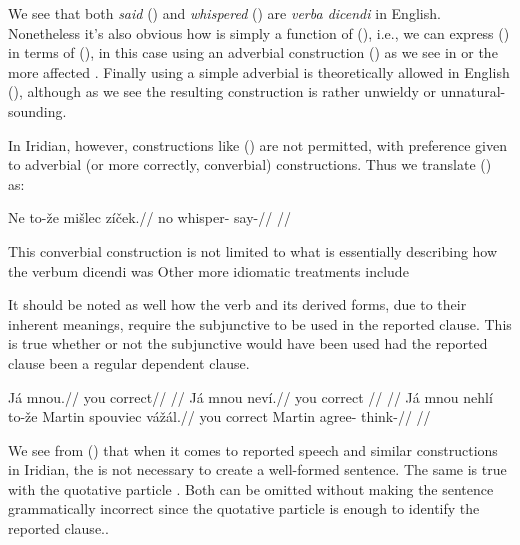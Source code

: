 \smallskip

We see that both \emph{said} () and \emph{whispered} () are \emph{verba dicendi} in English. Nonetheless it's also obvious how  is simply a function of (), i.e., we can express () in terms of (), in this case using an adverbial construction () as we see in  or the more affected . Finally using a simple adverbial is theoretically allowed in English (), although as we see the resulting construction is rather unwieldy or unnatural-sounding.

In Iridian, however, constructions like () are not permitted, with preference given to adverbial (or more correctly, converbial) constructions. Thus we translate () as:

\pex
\begingl
\gla Ne to-\v{z}e mi\v{s}lec z\'i\v{c}ek.//
\glb no  whisper- say-//
\glft {}//
\endgl
\xe


This converbial construction is not limited to what is essentially describing how the verbum dicendi was  Other more idiomatic treatments include


It should be noted as well how the verb  and its derived forms, due to their inherent meanings, require the subjunctive to be used in the reported clause. This is true whether or not the subjunctive would have been used had the reported clause been a regular dependent clause.


\pex
\a
\begingl
  \gla Já mnou.//
  \glb you correct//
  \glft {}//
\endgl
\a
\begingl
  \gla Já mnou nev\'i.//
  \glb you correct //
  \glft {}//
\endgl
\a
\begingl
  \gla Já mnou nehl\'i to-\v{z}e Martin spouviec v\'a\v{z}\'al.//
  \glb you correct   Martin agree- think-//
  \glft {}//
\endgl
\xe



We see from () that when it comes to reported speech and similar constructions in Iridian, the  is not necessary to create a well-formed sentence. The same is true with the quotative particle . Both can be omitted without making the sentence grammatically incorrect since the quotative particle is enough to identify the reported clause..

